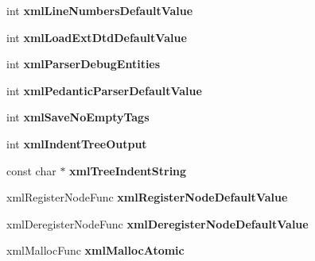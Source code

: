\begin{DoxyCompactItemize}
\item 
\hypertarget{struct__xml_global_state_a60edc1852ca27c7910919b2b0813f0f8}{int {\bfseries xml\-Line\-Numbers\-Default\-Value}}\label{struct__xml_global_state_a60edc1852ca27c7910919b2b0813f0f8}

\item 
\hypertarget{struct__xml_global_state_a5372304342b0799d753b848b4ff797f2}{int {\bfseries xml\-Load\-Ext\-Dtd\-Default\-Value}}\label{struct__xml_global_state_a5372304342b0799d753b848b4ff797f2}

\item 
\hypertarget{struct__xml_global_state_ab1de5b17ba7c598ab79b3f842f017c26}{int {\bfseries xml\-Parser\-Debug\-Entities}}\label{struct__xml_global_state_ab1de5b17ba7c598ab79b3f842f017c26}

\item 
\hypertarget{struct__xml_global_state_aed754d7889fb431e0d9623660db32ea3}{int {\bfseries xml\-Pedantic\-Parser\-Default\-Value}}\label{struct__xml_global_state_aed754d7889fb431e0d9623660db32ea3}

\item 
\hypertarget{struct__xml_global_state_a2e91a726bfc9552958e60c867ebb4a7b}{int {\bfseries xml\-Save\-No\-Empty\-Tags}}\label{struct__xml_global_state_a2e91a726bfc9552958e60c867ebb4a7b}

\item 
\hypertarget{struct__xml_global_state_a321904b6d88296e892ebe7120aa62ace}{int {\bfseries xml\-Indent\-Tree\-Output}}\label{struct__xml_global_state_a321904b6d88296e892ebe7120aa62ace}

\item 
\hypertarget{struct__xml_global_state_a02abcd3108a8256afc6342b364fce724}{const char $\ast$ {\bfseries xml\-Tree\-Indent\-String}}\label{struct__xml_global_state_a02abcd3108a8256afc6342b364fce724}

\item 
\hypertarget{struct__xml_global_state_a30d6034926e4292ce0feec490008c568}{xml\-Register\-Node\-Func {\bfseries xml\-Register\-Node\-Default\-Value}}\label{struct__xml_global_state_a30d6034926e4292ce0feec490008c568}

\item 
\hypertarget{struct__xml_global_state_a7dd29e256c9eeb78789c6f483bd4098b}{xml\-Deregister\-Node\-Func {\bfseries xml\-Deregister\-Node\-Default\-Value}}\label{struct__xml_global_state_a7dd29e256c9eeb78789c6f483bd4098b}

\item 
\hypertarget{struct__xml_global_state_ab2b37c13cce8ccc8a7bb0e0a47474563}{xml\-Malloc\-Func {\bfseries xml\-Malloc\-Atomic}}\label{struct__xml_global_state_ab2b37c13cce8ccc8a7bb0e0a47474563}


\end{DoxyCompactItemize}
